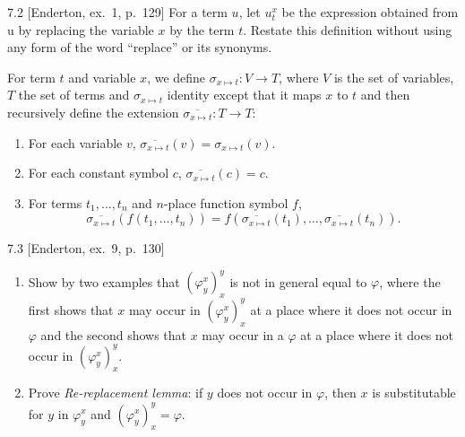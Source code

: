 \begin{exercise}{7.2}
  [Enderton, ex.~1, p.~129]
  For a term $u$, let $u_t^x$ be the expression obtained from u by replacing the variable $x$ by the term $t$. Restate this definition without using any form of the word “replace” or its synonyms.
\end{exercise}

For term $t$ and variable $x$, we define $\sigma_{x\mapsto t}:V\rightarrow T$, where $V$ is the set of variables, $T$ the set of terms and $\sigma_{x\mapsto t}$ identity except that it maps $x$ to $t$ and then recursively define the extension $\overline{\sigma_{x\mapsto t}}:T\rightarrow T$:
\begin{enumerate}
  \item For each variable $v$, $\overline{\sigma_{x\mapsto t}}(v)=\sigma_{x\mapsto t}(v)$.
  \item For each constant symbol $c$, $\overline{\sigma_{x\mapsto t}}(c)=c$.
  \item For terms $t_1,\dots,t_n$ and $n$-place function symbol $f$,
        \[\overline{\sigma_{x\mapsto t}}(f(t_1,\dots,t_n))=f(\overline{\sigma_{x\mapsto t}}(t_1),\dots,\overline{\sigma_{x\mapsto t}}(t_n)).\]
\end{enumerate}

\begin{exercise}{7.3}
  [Enderton, ex.~9, p.~130]
  \begin{enumerate}[label=(\alph*)]
    \item Show by two examples that $(\varphi_y^x)_x^y$ is not in general equal to $\varphi$, where the first shows that $x$ may occur in $(\varphi_y^x)_x^y$ at a place where it does not occur in $\varphi$ and the second shows that $x$ may occur in a $\varphi$ at a place where it does not occur in $(\varphi_y^x)_x^y$.
    \item Prove \textit{Re-replacement lemma}: if $y$ does not occur in $\varphi$, then $x$ is substitutable for $y$ in $\varphi_y^x$ and $(\varphi_y^x)_x^y=\varphi$.\qedhere
  \end{enumerate}
\end{exercise}

